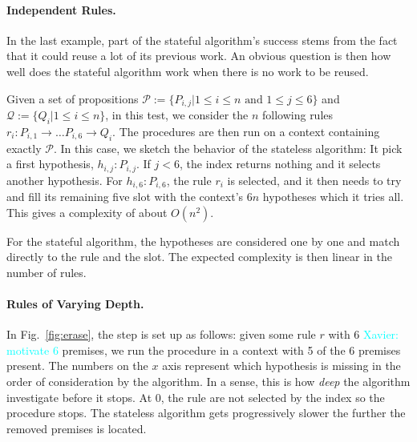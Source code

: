 \documentclass[runningheads]{llncs}
\newcommand{\xcom}[1]{{\textcolor{cyan}{Xavier: #1}} }
\begin{document}
\paragraph{Independent Rules.}
In the last example, part of the stateful algorithm's success stems from the fact that it could reuse a lot of its previous work.
An obvious question is then how well does the stateful algorithm work when there is no work to be reused.

Given a set of propositions $\mathcal{P} := \{P_{i,j} | 1 \leq i \leq n \text{ and } 1 \leq j \leq 6\}$ and $\mathcal{Q} :=\{Q_{i} | 1 \leq i \leq n \}$, in this test, we consider the $n$ following rules $r_i : P_{i,1}\to \dots P_{i,6} \to Q_i$.
The procedures are then run on a context containing exactly $\mathcal{P}$.
In this case, we sketch the behavior of the stateless algorithm:
It pick a first hypothesis, $h_{i,j} : P_{i,j}$.
If $j < 6$, the index returns nothing and it selects another hypothesis.
For $h_{i,6} : P_{i,6}$, the rule $r_i$ is selected, and it then needs to try and fill its remaining five slot with the context's $6n$ hypotheses which it tries all.
This gives a complexity of about $O(n^2)$.

For the stateful algorithm, the hypotheses are considered one by one and match directly to the rule and the slot.
The expected complexity is then linear in the number of rules.

\paragraph{Rules of Varying Depth.}
In Fig.~\ref{fig:erase}, the step is set up as follows: given some rule $r$ with $6$ \xcom{motivate 6} premises, we run the procedure in a context with 5 of the 6 premises present.
The numbers on the $x$ axis represent which hypothesis is missing in the order of consideration by the algorithm.
In a sense, this is how \textit{deep} the algorithm investigate before it stops.
At $0$, the rule are not selected by the index so the procedure stops.
The stateless algorithm gets progressively slower the further the removed premises is located.
\end{document}
